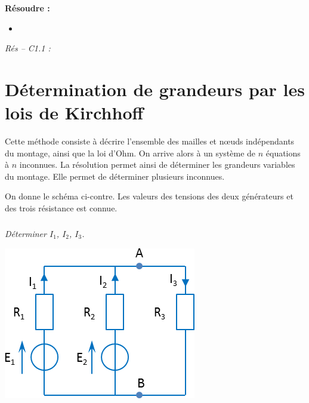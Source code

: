 \documentclass[10pt]{article}
\begin{document}






\begin{comp}
\noindent \textbf{Résoudre :} 
\begin{itemize}
\item 
\end{itemize}

\noindent \textit{Rés -- C1.1 :} 
\end{comp}

\section*{Détermination de grandeurs par les lois de Kirchhoff}

\begin{minipage}[c]{.55\linewidth}
\begin{methode}
Cette méthode consiste à décrire l’ensemble des mailles et nœuds indépendants du montage, ainsi que la loi d’Ohm. On arrive alors à un système de $n$ équations à $n$ inconnues. La résolution permet ainsi de déterminer les grandeurs variables du montage. Elle permet de déterminer plusieurs inconnues.
\end{methode}
On donne le schéma ci-contre. Les valeurs des tensions des deux générateurs et des trois résistance est connue. 

\subparagraph{}\textit{Déterminer $I_1$, $I_2$, $I_3$.}
 \end{minipage} \hfill
\begin{minipage}[c]{.4\linewidth}
\begin{center}
\includegraphics[width=\textwidth]{images/exo_01_01}
\end{center}
\end{minipage}
\end{document}
